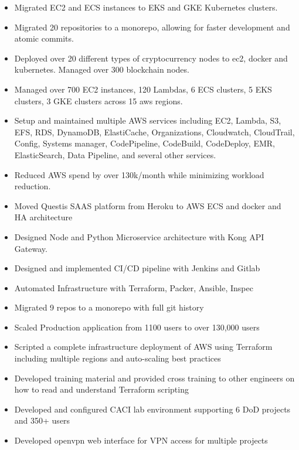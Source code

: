 \documentclass[10pt,a4paper,roman]{moderncv} %
\begin{document}
{
\begin{itemize}
\item Migrated EC2 and ECS instances to EKS and GKE Kubernetes clusters.
\item Migrated 20 repositories to a monorepo, allowing for faster development and atomic commits.
\item Deployed over 20 different types of cryptocurrency nodes to ec2, docker and kubernetes. Managed over 300 blockchain nodes.
\item Managed over 700 EC2 instances, 120 Lambdas, 6 ECS clusters, 5 EKS clusters, 3 GKE clusters across 15 aws regions.
\item Setup and maintained multiple AWS services including EC2, Lambda, S3, EFS, RDS, DynamoDB, ElastiCache, Organizations, Cloudwatch, CloudTrail, Config, Systems manager, CodePipeline, CodeBuild, CodeDeploy, EMR, ElasticSearch, Data Pipeline, and several other services.
\item Reduced AWS spend by over 130k/month while minimizing workload reduction.
\end{itemize}
}

{
\begin{itemize}
\item Moved Questis SAAS platform from Heroku to AWS ECS and docker and HA architecture
\item Designed Node and Python Microservice architecture with Kong API Gateway.
\item Designed and implemented CI/CD pipeline with Jenkins and Gitlab
\item Automated Infrastructure with Terraform, Packer, Ansible, Inspec
\item Migrated 9 repos to a monorepo with full git history
\item Scaled Production application from 1100 users to over 130,000 users
\end{itemize}}

{
\begin{itemize}
\item Scripted a complete infrastructure deployment of AWS using Terraform including multiple regions and auto-scaling best practices
\item Developed training material and provided cross training to other engineers on how to read and understand Terraform scripting
\item Developed and configured CACI lab environment supporting 6 DoD projects and 350+ users
\item Developed openvpn web interface for VPN access for multiple projects
\end{itemize}}
\end{document}
